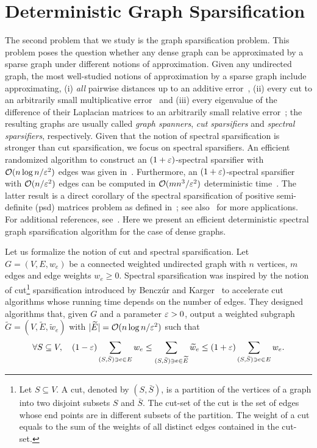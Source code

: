 \section{Deterministic Graph Sparsification}\label{sec::graph_sparsifiers}
%
The second problem that we study is the graph sparsification problem. This problem poses the question whether any dense graph can be approximated by a sparse graph under different notions of approximation. Given any undirected graph, the most well-studied notions of approximation by a sparse graph include approximating, (i) \emph{all} pairwise distances up to an additive error~\cite{graph:spanners:PelegS89}, (ii) every cut to an arbitrarily small multiplicative error~\cite{graph:sparsifier:BenczurK96} and (iii) every eigenvalue of the difference of their Laplacian matrices to an arbitrarily small relative error~\cite{graph:sparsifier:ICM2010}; the resulting graphs are usually called \emph{graph spanners}, \emph{cut sparsifiers} and \emph{spectral sparsifiers}, respectively. Given that the notion of spectral sparsification is stronger than cut sparsification, we focus on spectral sparsifiers. An efficient randomized algorithm to construct an $(1+\varepsilon)$-spectral sparsifier with $\mathcal{O}(n\log n /\varepsilon^2)$ edges was given in~\cite{graph:sparsifiers:eff_resistance}. Furthermore, an $(1+\varepsilon)$-spectral sparsifier with $\mathcal{O}(n/\varepsilon^2)$ edges can be computed in $\mathcal{O}(mn^3/\varepsilon^2)$ deterministic time~\cite{graph:sparsifiers:twice_ram}. The latter result is a direct corollary of the spectral sparsification of positive semi-definite (psd) matrices problem as defined in~\cite{phdthesis:Srivastava:2010}; see also~\cite{graph:sparsification:Naor} for more applications. For additional references, see~\cite{graph:sparse:Harvey}. Here we present an efficient deterministic spectral graph sparsification algorithm for the case of dense graphs.
%

%
Let us formalize the notion of cut and spectral sparsification. Let $G=(V,E,w_e)$ be a connected weighted undirected graph with $n$ vertices, $m$ edges and edge weights $w_e\geq 0$. Spectral sparsification was inspired by the notion of cut\footnote{Let $S\subseteq V$. A cut, denoted by $(S,\bar{S})$, is a partition of the vertices of a graph into two disjoint subsets $S$ and $\bar{S}$. The cut-set of the cut is the set of edges whose end points are in different subsets of the partition. The weight of a cut equals to the sum of the weights of all distinct edges contained in the cut-set.} sparsification introduced by Bencz\'{u}r and Karger~\cite{graph:sparsifier:BenczurK96} to accelerate cut algorithms whose running time depends on the number of edges. They designed algorithms that, given $G$ and a parameter $\varepsilon>0$, output a weighted subgraph $\widetilde{G}=(V,\widetilde{E},\widetilde{w}_e)$ with $|\widetilde{E}|=\mathcal{O}(n\log n /\varepsilon^2)$ such that
\begin{equation}\label{cut_sparsifier:cond}
\forall S \subseteq V, \quad (1-\varepsilon)\sum_{ (S,\bar{S}) \ni e\in{E}  } w_e \leq \sum_{(S,\bar{S}) \ni e\in{\widetilde{E}} } \widetilde{w}_e \leq (1+\varepsilon)\sum_{(S,\bar{S}) \ni e\in{E} } w_e.
\end{equation}
%

